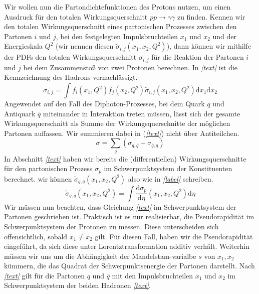 Wir wollen nun die Partondichtefunktionen des Protons nutzen, um einen Ausdruck für den totalen Wirkungsquerschnitt $pp \rightarrow \gamma \gamma $ zu finden. Kennen wir den totalen Wirkungsquerschnitt eines partonischen Prozesses zwischen den Partonen $i$ und $j$, bei den festgelegten Impulsbruchteilen $x_1$ und $x_2$ und der Energieskala $Q^2$ (wir nennen diesen $\tilde{\sigma}_{i,j}(x_1, x_2, Q^2)$), dann können wir mithilfe der PDFs den totalen Wirkungsquerschnitt $\sigma_{i,j}$ für die Reaktion der Partonen $i$ und $j$ bei dem Zusammenstoß von zwei Protonen berechnen. In \textit{\autoref{text}} ist die Kennzeichnung des Hadrons vernachlässigt.  
\begin{equation}
	\sigma_{i,j} = \int f_i(x_1, Q^2)f_j(x_2, Q^2) \tilde{\sigma}_{i,j}(x_1, x_2, Q^2)\text{d}x_1\text{d}x_2
\end{equation} 
Angewendet auf den Fall des Diphoton-Prozesses, bei dem Quark $q$ und Antiquark $\overline{q}$ miteinander in Interaktion treten müssen, lässt sich der gesamte Wirkungsquerschnitt als Summe der Wirkungsquerschnitte der möglichen Partonen auffassen. Wir summieren dabei in (\textit{\autoref{text}}) nicht über Antiteilchen.
\begin{equation}
	\sigma = \sum_{q} \left(\sigma_{q,\overline{q}} + \sigma_{\overline{q},q} \right) 
\end{equation}
In Abschnitt \textit{\autoref{text}} haben wir bereits die (differentiellen) Wirkungsquerschnitte für den partonischen Prozess $\sigma_p$ im Schwerpunktsystem der Konstituenten berechnet. wir können $\tilde{\sigma}_{q,\overline{q}}(x_1, x_2, Q^2)$ also wie in \textit{\autoref{label}} schreiben.
\begin{equation}
	\tilde{\sigma}_{q,\overline{q}}(x_1, x_2, Q^2) = \int \frac{\text{d}\sigma_{p}}{\text{d}\eta}\left(x_1,x_2, Q^2\right)\text{d} \eta
\end{equation}
Wir müssen nun beachten, dass Gleichung \textit{\autoref{text}} im Schwerpunktsystem der Partonen geschrieben ist. Praktisch ist es nur realisierbar, die Pseudorapidität im Schwerpunktsystem der Protonen zu messen. Diese unterscheiden sich offensichtlich, sobald $x_1 \neq x_2$ gilt. Für diesen Fall, haben wir die Pseudorapidität eingeführt, da sich diese unter Lorentztransformation additiv verhält. Weiterhin müssen wir uns um die Abhängigkeit der Mandelstam-varialbe $s$ von $x_1, x_2$ kümmern, die das Quadrat der Schwerpunktsenergie der Partonen darstellt. Nach \textit{\autoref{text}} gilt für die Partonen $q$ und $\overline{q}$ mit den Impulsbruchteilen $x_1$ und $x_2$ im Schwerpunktsystem der beiden Hadronen \textit{\autoref{text}}.
